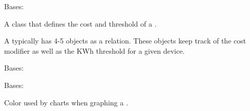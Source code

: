 \documentclass[letterpaper,10pt,english]{sphinxmanual}
\begin{document}
\begin{fulllineitems}
\label{modules/webapp:webapp.models.Tier}
Bases: 

A class that defines the cost and threshold of a {\hyperref[modules/webapp:webapp.models.RatePlan]{\emph{}}}.

A {\hyperref[modules/webapp:webapp.models.RatePlan]{\emph{}}} typically has 4-5 {\hyperref[modules/webapp:webapp.models.Tier]{\emph{}}} objects
as a relation. These objects keep track of the cost modifier as well as the KWh threshold
for a given device.

\begin{fulllineitems}
\label{modules/webapp:webapp.models.Tier.DoesNotExist}
Bases: 

\end{fulllineitems}


\begin{fulllineitems}
\label{modules/webapp:webapp.models.Tier.MultipleObjectsReturned}
Bases: 

\end{fulllineitems}


\begin{fulllineitems}
\label{modules/webapp:webapp.models.Tier.chart_color}
Color used by charts when graphing a {\hyperref[modules/webapp:webapp.models.Tier]{\emph{}}}.

\end{fulllineitems}


\begin{fulllineitems}
\label{modules/webapp:webapp.models.Tier.devicewebsettings_set}
\end{fulllineitems}


\end{fulllineitems}
\end{document}

